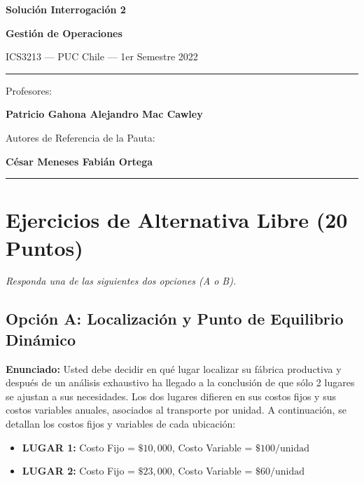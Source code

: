 \documentclass[11pt, a4paper]{article}
\begin{document}
\begin{titlepage}
  \centering
  \vspace*{2cm}
  {\Huge\bfseries\color{gopcyan} Solución Interrogación 2\par}
  \vspace{0.4cm}
  {\LARGE\bfseries Gestión de Operaciones\par}
  \vspace{0.3cm}
  {\large ICS3213 --- PUC Chile --- 1er Semestre 2022\par}
  \vspace{1.2cm}
  \rule{\textwidth}{0.4pt}
  \vspace{0.4cm}

  {\small Profesores:\par}
  {\large\bfseries Patricio Gahona \quad Alejandro Mac Cawley\par}
  \vspace{0.3cm}
  {\small Autores de Referencia de la Pauta:\par}
  {\small\textbf{César Meneses \quad Fabián Ortega}\par}
  \vspace{0.4cm}
  \rule{\textwidth}{0.4pt}
  \vspace{1cm}

  \vfill
\end{titlepage}

\newpage

\section{Ejercicios de Alternativa Libre (20 Puntos)}
\textit{Responda una de las siguientes dos opciones (A o B).}

\subsection*{Opción A: Localización y Punto de Equilibrio Dinámico}

  \textbf{Enunciado:}
  Usted debe decidir en qué lugar localizar su fábrica productiva y después de un análisis exhaustivo ha llegado a la conclusión de que sólo 2 lugares se ajustan a sus necesidades. Los dos lugares difieren en sus costos fijos y sus costos variables anuales, asociados al transporte por unidad. A continuación, se detallan los costos fijos y variables de cada ubicación:
  \begin{itemize}
    \item \textbf{LUGAR 1:} Costo Fijo = $\$10,000$, Costo Variable = $\$100/\text{unidad}$
    \item \textbf{LUGAR 2:} Costo Fijo = $\$23,000$, Costo Variable = $\$60/\text{unidad}$
  \end{itemize}
\end{document}
